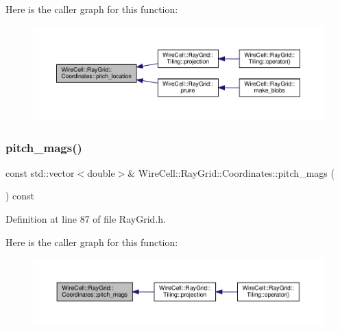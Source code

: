 Here is the caller graph for this function\+:
\nopagebreak
\begin{figure}[H]
\begin{center}
\leavevmode
\includegraphics[width=350pt]{class_wire_cell_1_1_ray_grid_1_1_coordinates_ab201bc4926236a43676cbac2a7953158_icgraph}
\end{center}
\end{figure}
\mbox{\label{class_wire_cell_1_1_ray_grid_1_1_coordinates_ae84a75729cdc5a180fe69d42809f72bc}} 
\subsubsection{\texorpdfstring{pitch\+\_\+mags()}{pitch\_mags()}}
{\footnotesize\ttfamily const std\+::vector$<$double$>$\& Wire\+Cell\+::\+Ray\+Grid\+::\+Coordinates\+::pitch\+\_\+mags (\begin{DoxyParamCaption}{ }\end{DoxyParamCaption}) const\hspace{0.3cm}{\ttfamily [inline]}}



Definition at line 87 of file Ray\+Grid.\+h.

Here is the caller graph for this function\+:
\nopagebreak
\begin{figure}[H]
\begin{center}
\leavevmode
\includegraphics[width=350pt]{class_wire_cell_1_1_ray_grid_1_1_coordinates_ae84a75729cdc5a180fe69d42809f72bc_icgraph}
\end{center}
\end{figure}
\mbox{\label{class_wire_cell_1_1_ray_grid_1_1_coordinates_a74db6f8c7255ed721ac5c3b99e45902b}} 
